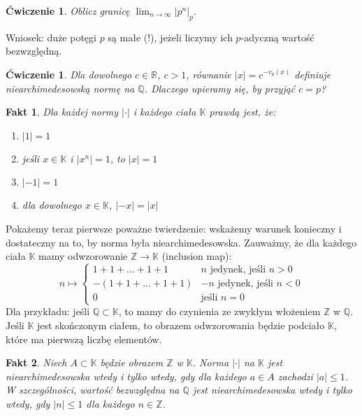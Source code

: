 \documentclass[a4paper,fleqn,9pt]{extarticle}
\newtheorem{prb}[prbh]{\'Cwiczenie}
\newtheorem{fkt}{Fakt}
\newenvironment{enumx}{\begin{enumerate}
	\setlength{\itemsep}{0pt}
	\setlength{\parskip}{0pt}
	\setlength{\parsep}{0pt}}
{\end{enumerate}}
\begin{document}

\begin{prb}
Oblicz granicę $\lim_{n\to\infty} |p^n|_p$.
\end{prb}

Wniosek: duże potęgi $p$ są małe (!), jeżeli liczymy ich $p$-adyczną wartość bezwzględną.

\begin{prb}
Dla dowolnego $c\in\mathbb R$, $c>1$, równanie $|x| = c^{-v_p(x)}$ definiuje niearchimedesowską normę na $\mathbb Q$.
Dlaczego upieramy się, by przyjąć $c=p$?
\end{prb}

\begin{fkt}
Dla każdej normy $|\cdot|$ i każdego ciała $\mathbb K$ prawdą jest, że:
\begin{enumx}
\item $|1| = 1$
\item jeśli $x\in\mathbb K$ i $|x^n| = 1$, to $|x| = 1$
\item $|-1| = 1$
\item dla dowolnego $x\in\mathbb K$, $|-x| = |x|$
\end{enumx}
\end{fkt}

Pokażemy teraz pierwsze poważne twierdzenie: wskażemy warunek konieczny i dostateczny na to, by norma była niearchimedesowska.
Zauważmy, że dla każdego ciała $\mathbb K$ mamy odwzorowanie $\mathbb Z \rightarrow \mathbb K$ (inclusion map):
\begin{equation*}
n \mapsto
\begin{cases}
{1 + 1 + \dots + 1 + 1} & n\text{ jedynek, jeśli } n > 0 \\
- ({1 + 1 + \dots + 1 + 1}) & -n \text{ jedynek, jeśli } n < 0 \\
 0  & \text{jeśli } n = 0 
\end{cases}
\end{equation*}
Dla przykładu: jeśli $\mathbb Q \subset \mathbb K$, to mamy do czynienia ze zwykłym włożeniem $\mathbb Z$ w $\mathbb Q$.
Jeśli $\mathbb K$ jest skończonym ciałem, to obrazem odwzorowania będzie podciało $\mathbb K$, które ma pierwszą liczbę elementów.

\begin{fkt}
Niech $A\subset \mathbb K$ będzie obrazem $\mathbb Z$ w $\mathbb K$.
Norma $|\cdot |$ na $\mathbb K$ jest niearchimedesowska wtedy i tylko wtedy, gdy dla każdego $a\in A$ zachodzi $|a| \le 1$.
W szczególności, wartość bezwzględna na $\mathbb Q$ jest niearchimedesowska wtedy i tylko wtedy, gdy $|n|\le 1$ dla każdego $n\in \mathbb Z$.
\end{fkt}
\end{document}
